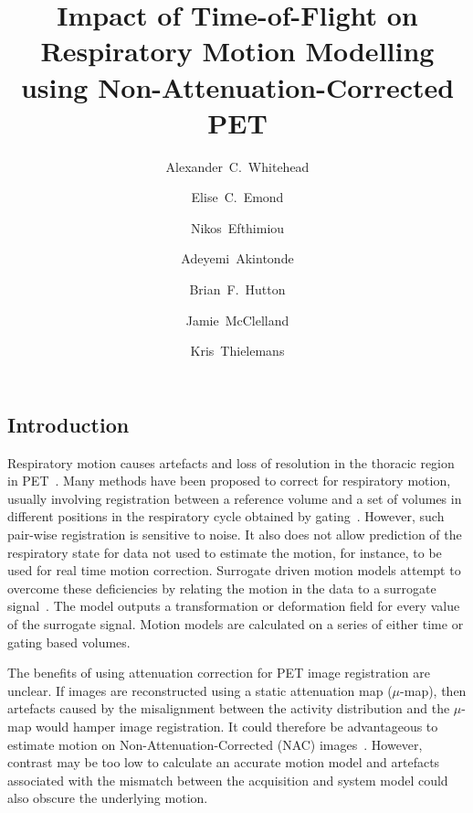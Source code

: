 \documentclass[portrait,color=UCLburgundy,margin=3cm]{uclposter}
\begin{document}
\title{Impact of Time-of-Flight on Respiratory Motion Modelling using Non-Attenuation-Corrected PET}

\author[1,2 *]{Alexander~C.~Whitehead}
\author[1]{Elise~C.~Emond}
\author[3]{Nikos~Efthimiou}
\author[1,2]{Adeyemi~Akintonde}
\author[1]{Brian~F.~Hutton}
\author[2]{Jamie~McClelland}
\author[1]{Kris~Thielemans}


\maketitle

\begin{multicols}{4}

\section*{Introduction}
Respiratory motion causes artefacts and loss of resolution in the thoracic region in PET~\cite{Nehmeh2008}. Many methods have been proposed to correct for respiratory motion, usually involving registration between a reference volume and a set of volumes in different positions in the respiratory cycle obtained by gating~\cite{Oliveira2014}. However, such pair-wise registration is sensitive to noise. It also does not allow prediction of the respiratory state for data not used to estimate the motion, for instance, to be used for real time motion correction. Surrogate driven motion models attempt to overcome these deficiencies by relating the motion in the data to a surrogate signal~\cite{McClelland2013}. The model outputs a transformation or deformation field for every value of the surrogate signal. Motion models are calculated on a series of either time or gating based volumes.

The benefits of using attenuation correction for PET image registration are unclear. If images are reconstructed using a static attenuation map ($\mu$-map), then artefacts caused by the misalignment between the activity distribution and the $\mu$-map would hamper image registration. It could therefore be advantageous to estimate motion on Non-Attenuation-Corrected (NAC) images~\cite{WenjiaBai2011}. However, contrast may be too low to calculate an accurate motion model and artefacts associated with the mismatch between the acquisition and system model could also obscure the underlying motion. 


\end{multicols}
\end{document}
